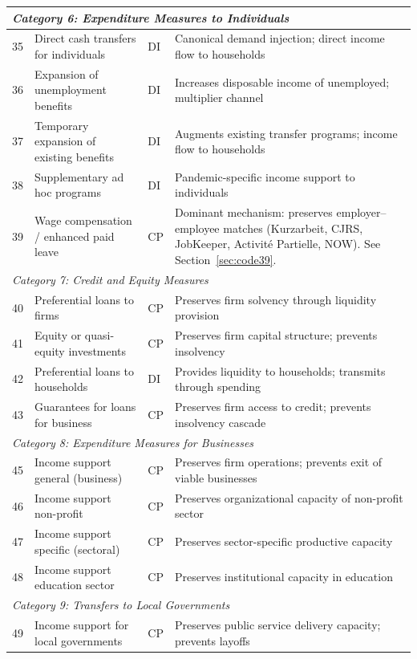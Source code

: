 \documentclass[12pt,a4paper]{article}
\begin{document}
\begin{small}
\begin{longtable}{p{0.6cm} p{5.8cm} p{1.2cm} p{5.5cm}}
\multicolumn{4}{l}{\textit{Category 6: Expenditure Measures to Individuals}} \\
\midrule
35 & Direct cash transfers for individuals & DI & Canonical demand injection; direct income flow to households \\
36 & Expansion of unemployment benefits & DI & Increases disposable income of unemployed; multiplier channel \\
37 & Temporary expansion of existing benefits & DI & Augments existing transfer programs; income flow to households \\
38 & Supplementary ad hoc programs & DI & Pandemic-specific income support to individuals \\
39 & Wage compensation / enhanced paid leave & CP & Dominant mechanism: preserves employer--employee matches (Kurzarbeit, CJRS, JobKeeper, Activit\'{e} Partielle, NOW). See Section~\ref{sec:code39}. \\
\midrule

\multicolumn{4}{l}{\textit{Category 7: Credit and Equity Measures}} \\
\midrule
40 & Preferential loans to firms & CP & Preserves firm solvency through liquidity provision \\
41 & Equity or quasi-equity investments & CP & Preserves firm capital structure; prevents insolvency \\
42 & Preferential loans to households & DI & Provides liquidity to households; transmits through spending \\
43 & Guarantees for loans for business & CP & Preserves firm access to credit; prevents insolvency cascade \\
\midrule

\multicolumn{4}{l}{\textit{Category 8: Expenditure Measures for Businesses}} \\
\midrule
45 & Income support general (business) & CP & Preserves firm operations; prevents exit of viable businesses \\
46 & Income support non-profit & CP & Preserves organizational capacity of non-profit sector \\
47 & Income support specific (sectoral) & CP & Preserves sector-specific productive capacity \\
48 & Income support education sector & CP & Preserves institutional capacity in education \\
\midrule

\multicolumn{4}{l}{\textit{Category 9: Transfers to Local Governments}} \\
\midrule
49 & Income support for local governments & CP & Preserves public service delivery capacity; prevents layoffs \\

\end{longtable}
\end{small}
\end{document}
